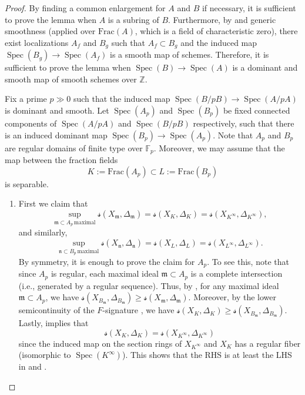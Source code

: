 \documentclass[11pt,reqno]{amsart}
\newcommand{\Z}{\mathbb{Z}}
\newcommand{\fm}{\mathfrak{m}}
\DeclareMathOperator{\Spec}{Spec}
\numberwithin{equation}{section}
\theoremstyle{definition}
\newcommand{\s}{\mathscr{s}}
\begin{document}
\begin{proof}
By finding a common enlargement for $A$ and $B$ if necessary, it is sufficient to prove the lemma when $A $ is a subring of $B$. Furthermore, by \cite[\href{https://stacks.math.columbia.edu/tag/00TF}{Tag 00TF}]{stacks-project} and generic smoothness (applied over $\text{Frac}(A)$, which is a field of characteristic zero), there exist localizations $A_f$ and $B_g$ such that $A_f \subset B_g$ and the induced map $\Spec(B_g) \to \Spec(A_f)$ is a smooth map of schemes. Therefore, it is sufficient to prove the lemma when $\Spec(B) \to \Spec(A)$ is a dominant and smooth map of smooth schemes over $\Z$.

Fix a prime $p \gg 0$ such that the induced map $ \Spec(B/pB) \to \Spec(A/pA)$ is dominant and smooth. Let $\Spec(A_p)$ and $\Spec(B_p)$ be fixed connected components of $\Spec(A/pA) $ and $\Spec(B/pB)$ respectively, such that there is an induced dominant map $\Spec(B_p) \to \Spec(A_p)$. Note that $A_p$ and $B_p$ are regular domains of finite type over $\mathbb{F}_p$. Moreover, we may assume that the map between the fraction fields
\[   K:= \text{Frac}(A_p) \subset L:=\text{Frac}(B_p)  \]
is separable.
\begin{enumerate}
    \item  First we claim that
\begin{equation} \label{supequalsgeneric1}   \sup_{ \fm \subset A_p \,  \text{maximal} } \s(X_{\fm}, \Delta_\fm) = \s(X_{K}, \Delta_{K}) = \s(X_{K^\infty}, \Delta_{K^\infty}), \end{equation}
and similarly,
\begin{equation} \label{supequalsgeneric2} \sup_{\mathfrak{n} \subset B_p \,  \text{maximal}} \s(X_{\mathfrak{n}} , \Delta_{\mathfrak{n}}) =\s (X_{L}, \Delta_{L}) = \s (X_{L^\infty}, \Delta_{L^\infty}) .  \end{equation}
By symmetry, it is enough to prove the claim for $A_p$. To see this, note that since $A_p$ is regular, each maximal ideal $\fm \subset A_p$ is a complete intersection (i.e., generated by a regular sequence). Thus, by \cite[Corollary 6.1]{TaylorAdjunctionforFsig}, for any maximal ideal $\fm \subset A_p$, we have $\s(X_{B_{\fm}}, \Delta_{B_\fm}) \geq \s(X_{\fm}, \Delta_\fm)$. Moreover, by the lower semicontinuity of the $F$-signature \cite[Theorem 5.7]{PolstraSemicontinuityofFsig}, we have $\s(X_K, \Delta_K) \geq \s(X_{B_{\fm}}, \Delta_{B_\fm})$. Lastly, \cite[Theorem~3.6]{CRSTBertiniTheorems} implies that 
\[ \s(X_{K}, \Delta_{K}) = \s(X_{K^\infty}, \Delta_{K^\infty}) \]
since the induced map on the section rings of $X_{K^\infty} $ and $ X_K$ has a regular fiber (isomorphic to $\Spec(K^\infty)$).
This shows that the RHS is at least the LHS in  and .



\end{enumerate}
\end{proof}
\end{document}
